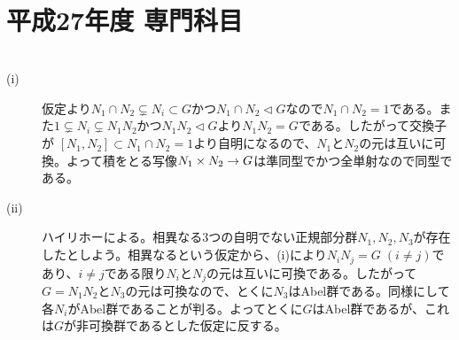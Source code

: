 \section{平成27年度 専門科目}

\subsubsection{}
\begin{sol} ${}$
  \begin{description}
    \item[(i)] 仮定より$N_1 \cap N_2 \subsetneq N_i \subset G$かつ$N_1 \cap N_2 \lhd G$なので$N_1 \cap N_2 = 1$である。また$1 \subsetneq N_i \subsetneq N_1 N_2 $かつ$N_1 N_2 \lhd G$より$N_1 N_2 = G$である。したがって交換子が
    $[N_1,N_2] \subset N_1 \cap N_2 = 1$より自明になるので、$N_1$と$N_2$の元は互いに可換。よって積をとる写像$N_1 \times N_2 \to G$は準同型でかつ全単射なので同型である。
    \item[(ii)] ハイリホーによる。相異なる$3$つの自明でない正規部分群$N_1, N_2, N_3$が存在したとしよう。相異なるという仮定から、(i)により$N_i N_j = G \; (i \neq j)$であり、$i \neq j$である限り$N_i$と$N_j$の元は互いに可換である。したがって$G = N_1 N_2$と$N_3$の元は可換なので、とくに$N_3$はAbel群である。同様にして各$N_i$がAbel群であることが判る。よってとくに$G$はAbel群であるが、これは$G$が非可換群であるとした仮定に反する。





  \end{description}
\end{sol}
